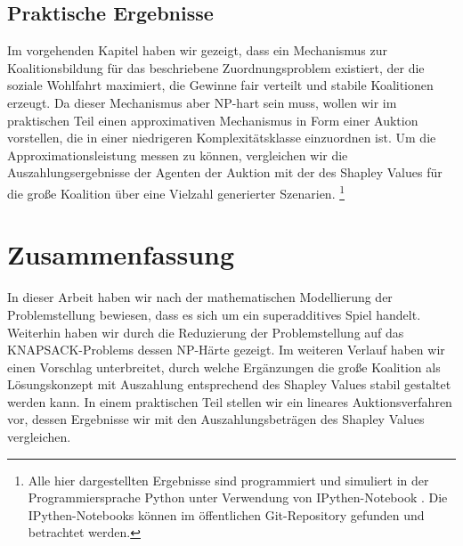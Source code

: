 \documentclass[sigconf]{acmart}
\theoremstyle{break}
\begin{document}
\subsection{Praktische Ergebnisse}
Im vorgehenden Kapitel haben wir gezeigt, dass ein Mechanismus zur Koalitionsbildung für das beschriebene Zuordnungsproblem existiert, der die soziale Wohlfahrt maximiert, die Gewinne fair verteilt und stabile Koalitionen erzeugt. Da dieser Mechanismus aber NP-hart sein muss, wollen wir im praktischen Teil einen approximativen Mechanismus in Form einer Auktion vorstellen, die in einer niedrigeren Komplexitätsklasse einzuordnen ist. Um die Approximationsleistung messen zu können, vergleichen wir die Auszahlungsergebnisse der Agenten der Auktion mit der des Shapley Values für die große Koalition über eine Vielzahl generierter Szenarien. \footnote{Alle hier dargestellten Ergebnisse sind programmiert und simuliert in der Programmiersprache Python unter Verwendung von IPythen-Notebook \cite{PER-GRA:2007}. Die IPythen-Notebooks können im öffentlichen Git-Repository \cite{git} gefunden und betrachtet werden.}


\section{Zusammenfassung}
  In dieser Arbeit haben wir nach der mathematischen Modellierung der Problemstellung bewiesen, dass es sich um ein superadditives Spiel handelt. Weiterhin haben wir durch die Reduzierung der Problemstellung auf das KNAPSACK-Problems dessen NP-Härte gezeigt.
  Im weiteren Verlauf haben wir einen Vorschlag unterbreitet, durch welche Ergänzungen die große Koalition als Lösungskonzept mit Auszahlung entsprechend des Shapley Values stabil gestaltet werden kann.
  In einem praktischen Teil stellen wir ein lineares Auktionsverfahren vor, dessen Ergebnisse wir mit den Auszahlungsbeträgen des Shapley Values vergleichen.



\end{document}
